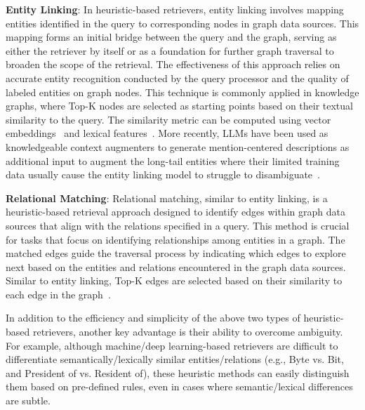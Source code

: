 \textbf{Entity Linking}: In heuristic-based retrievers, entity linking involves mapping entities identified in the query to corresponding nodes in graph data sources. This mapping forms an initial bridge between the query and the graph, serving as either the retriever by itself or as a foundation for further graph traversal to broaden the scope of the retrieval. The effectiveness of this approach relies on accurate entity recognition conducted by the query processor and the quality of labeled entities on graph nodes. This technique is commonly applied in knowledge graphs, where Top-K nodes are selected as starting points based on their textual similarity to the query. The similarity metric can be computed using vector embeddings~\cite{wen2023mindmap, sanmartin2024kg} and lexical features~\cite{wang2024knowledge}. More recently, LLMs have been used as knowledgeable context augmenters to generate mention-centered descriptions as additional input to augment the long-tail entities where their limited training data usually cause the entity linking model to struggle to disambiguate~\cite{xin2024llmael}.


\textbf{Relational Matching}:
Relational matching, similar to entity linking, is a heuristic-based retrieval approach designed to identify edges within graph data sources that align with the relations specified in a query. This method is crucial for tasks that focus on identifying relationships among entities in a graph. The matched edges guide the traversal process by indicating which edges to explore next based on the entities and relations encountered in the graph data sources. Similar to entity linking, Top-K edges are selected based on their similarity to each edge in the graph~\cite{kim2023kg, gao2024two}.


In addition to the efficiency and simplicity of the above two types of heuristic-based retrievers, another key advantage is their ability to overcome ambiguity. For example, although machine/deep learning-based retrievers are difficult to differentiate semantically/lexically similar entities/relations (e.g., Byte vs. Bit, and President of vs. Resident of), these heuristic methods can easily distinguish them based on pre-defined rules, even in cases where semantic/lexical differences are subtle.


